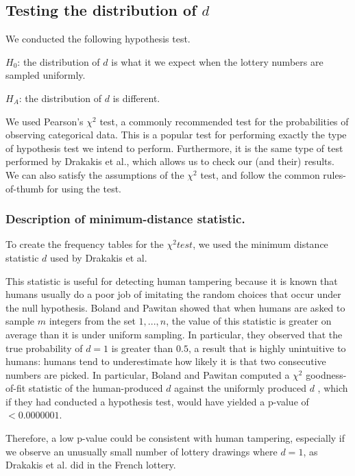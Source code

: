 \subsection{Testing the distribution of $d$}

We conducted the following hypothesis test.

$H_0$: the distribution of $d$ is what it we expect when the lottery numbers are sampled uniformly.

$H_A$: the distribution of $d$ is different.

We used Pearson's $\chi^2$ test, a commonly recommended test for the probabilities of observing categorical data. 
This is a popular test for performing exactly the type of hypothesis test we intend to perform.
Furthermore, it is the same type of test performed by Drakakis et al., which allows us to 
check our (and their) results. We can also satisfy the assumptions of the $\chi^2$ test, and 
follow the common rules-of-thumb for using the test. 

\subsubsection{Description of minimum-distance statistic.}

To create the frequency tables for the $\chi^2 test$, we used the minimum distance statistic $d$ used by Drakakis et al.


This statistic is useful for detecting human tampering because it is known that humans usually do a
poor job of imitating the random choices that occur under the null hypothesis. Boland and Pawitan showed
that when humans are asked to sample $m$ integers from the set ${1,...,n}$, the value
of this statistic is greater on average than it is under uniform sampling. In particular,
they observed that the true probability of $d = 1$ is greater than $0.5$, a result that 
is highly unintuitive to humans: humans tend to underestimate how likely it is that
two consecutive numbers are picked. In particular, Boland and Pawitan
computed a $\chi^2$ goodness-of-fit statistic of the human-produced $d$ against the uniformly produced $d$
, which if they had conducted a hypothesis test, would have yielded a 
p-value of $< 0.0000001$. 

Therefore, a low p-value could be consistent with human tampering, especially if we
observe an unusually small number of lottery drawings where $d = 1$, as Drakakis et al.
did in the French lottery. 

